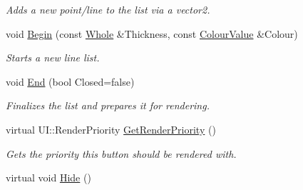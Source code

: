 \begin{DoxyCompactItemize}
\begin{DoxyCompactList}\small\item\em Adds a new point/line to the list via a vector2. \item\end{DoxyCompactList}\item 
void \hyperlink{classphys_1_1UI_1_1LineList_adb0f29fc8f83baeec9f36f4e99e04a53}{Begin} (const \hyperlink{namespacephys_a460f6bc24c8dd347b05e0366ae34f34a}{Whole} \&Thickness, const \hyperlink{classphys_1_1ColourValue}{ColourValue} \&Colour)
\begin{DoxyCompactList}\small\item\em Starts a new line list. \item\end{DoxyCompactList}\item 
void \hyperlink{classphys_1_1UI_1_1LineList_a8ea40817665ec539b4ff97a64b73317f}{End} (bool Closed=false)
\begin{DoxyCompactList}\small\item\em Finalizes the list and prepares it for rendering. \item\end{DoxyCompactList}\item 
virtual UI::RenderPriority \hyperlink{classphys_1_1UI_1_1LineList_a95aa150344304a49d8f6c6024d6a5351}{GetRenderPriority} ()
\begin{DoxyCompactList}\small\item\em Gets the priority this button should be rendered with. \item\end{DoxyCompactList}\item 
\hypertarget{classphys_1_1UI_1_1LineList_a4e1d09adc4ed6947d93ae6030e00263e}{
virtual void \hyperlink{classphys_1_1UI_1_1LineList_a4e1d09adc4ed6947d93ae6030e00263e}{Hide} ()}
\label{classphys_1_1UI_1_1LineList_a4e1d09adc4ed6947d93ae6030e00263e}


\end{DoxyCompactItemize}
